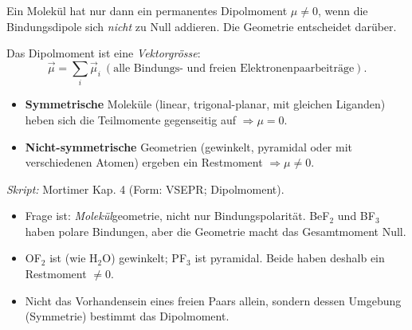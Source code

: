 

Ein Molekül hat nur dann ein permanentes Dipolmoment $\mu\neq 0$, wenn die
Bindungsdipole sich \emph{nicht} zu Null addieren. Die Geometrie entscheidet
darüber.

\begin{werkzeugkasten}
Das Dipolmoment ist eine \emph{Vektorgrösse}:
\[
  \vec\mu = \sum_i \vec\mu_i\ (\text{alle Bindungs- und freien
  Elektronenpaarbeiträge}).
\]
\begin{itemize}
  \item \textbf{Symmetrische} Moleküle (linear, trigonal-planar, mit gleichen
        Liganden) heben sich die Teilmomente gegenseitig auf $\Rightarrow
        \mu = 0$.
  \item \textbf{Nicht-symmetrische} Geometrien (gewinkelt, pyramidal oder
        mit verschiedenen Atomen) ergeben ein Restmoment $\Rightarrow
        \mu\neq 0$.
\end{itemize}
\textit{Skript:} Mortimer Kap. 4 (Form: VSEPR; Dipolmoment).
\end{werkzeugkasten}

\begin{achtung}
\begin{itemize}
  \item Frage ist: \emph{Molekül}geometrie, nicht nur Bindungspolarität.
        BeF$_2$ und BF$_3$ haben polare Bindungen, aber die Geometrie macht
        das Gesamtmoment Null.
  \item OF$_2$ ist (wie H$_2$O) gewinkelt; PF$_3$ ist pyramidal. Beide haben
        deshalb ein Restmoment $\neq 0$.
  \item Nicht das Vorhandensein eines freien Paars allein, sondern dessen
        Umgebung (Symmetrie) bestimmt das Dipolmoment.
\end{itemize}
\end{achtung}
